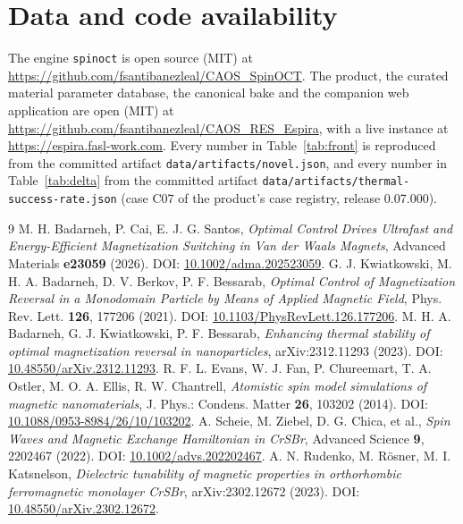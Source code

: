 \documentclass[11pt]{article}
\newcommand{\doi}[1]{DOI: \href{https://doi.org/#1}{#1}}
\begin{document}
\section*{Data and code availability}

The engine \texttt{spinoct} is open source (MIT) at
\url{https://github.com/fsantibanezleal/CAOS_SpinOCT}. The product, the curated material parameter
database, the canonical bake and the companion web application are open (MIT) at
\url{https://github.com/fsantibanezleal/CAOS_RES_Espira}, with a live instance at
\url{https://espira.fasl-work.com}. Every number in Table~\ref{tab:front} is reproduced from the
committed artifact \texttt{data/artifacts/novel.json}, and every number in Table~\ref{tab:delta} from the
committed artifact \texttt{data/artifacts/thermal-success-rate.json} (case C07 of the product's case
registry, release 0.07.000).

\begin{thebibliography}{9}
 M. H. Badarneh, P. Cai, E. J. G. Santos,
\emph{Optimal Control Drives Ultrafast and Energy-Efficient Magnetization Switching in Van der Waals
Magnets}, Advanced Materials \textbf{e23059} (2026). \doi{10.1002/adma.202523059}.
 G. J. Kwiatkowski, M. H. A. Badarneh, D. V. Berkov, P. F. Bessarab,
\emph{Optimal Control of Magnetization Reversal in a Monodomain Particle by Means of Applied Magnetic
Field}, Phys. Rev. Lett. \textbf{126}, 177206 (2021). \doi{10.1103/PhysRevLett.126.177206}.
 M. H. A. Badarneh, G. J. Kwiatkowski, P. F. Bessarab,
\emph{Enhancing thermal stability of optimal magnetization reversal in nanoparticles},
arXiv:2312.11293 (2023). \doi{10.48550/arXiv.2312.11293}.
 R. F. L. Evans, W. J. Fan, P. Chureemart, T. A. Ostler, M. O. A. Ellis,
R. W. Chantrell, \emph{Atomistic spin model simulations of magnetic nanomaterials}, J. Phys.: Condens.
Matter \textbf{26}, 103202 (2014). \doi{10.1088/0953-8984/26/10/103202}.
 A. Scheie, M. Ziebel, D. G. Chica, et al.,
\emph{Spin Waves and Magnetic Exchange Hamiltonian in CrSBr}, Advanced Science \textbf{9}, 2202467
(2022). \doi{10.1002/advs.202202467}.
 A. N. Rudenko, M. R\"osner, M. I. Katsnelson,
\emph{Dielectric tunability of magnetic properties in orthorhombic ferromagnetic monolayer CrSBr},
arXiv:2302.12672 (2023). \doi{10.48550/arXiv.2302.12672}.
\end{thebibliography}
\end{document}
